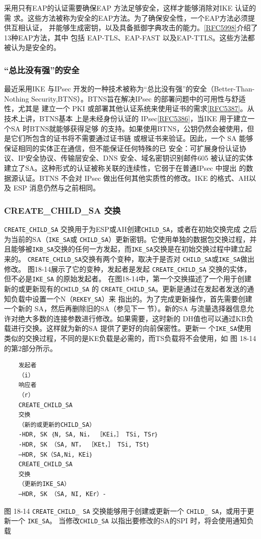 采用只有EAP的认证需要确保EAP 方法足够安全，这样才能够消除对IKE 认证的需
求。这些方法被称为安全的EAP方法。为了确保安全性，一个EAP方法必须提供互相认证，
并能够生成密钥，以及具备抵御字典攻击的能力。\href{https://www.rfc-editor.org/rfc/rfc5998}{[RFC5998]}介绍了13种EAP方法，其中
包括 EAP-TLS、EAP-FAST 以及EAP-TTLS。这些方法都被认为是安全的。

\subsubsection{“总比没有强”的安全}

最近采用IKE 与IPsec 开发的一种技术被称为“总比没有强”的安全（Better-Than-
Nothing Security,BTNS）。BTNS旨在解决IPsec 的部署问题中的可用性与舒适性，尤其是
建立一个 PKI 或部署其他认证系统来使用证书的需求\href{https://www.rfc-editor.org/rfc/rfc5387}{[RFC5387]}。从技术上讲，BTNS基本
上是未经身份认证的 IPsec\href{https://www.rfc-editor.org/rfc/rfc5386}{[RFC5386]}，当IKE 用于建立一个SA 时BTNS就能够获得足够
的支持。如果使用BTNS，公钥仍然会被使用，但是它们所包含的证书将不需要通过证书链
或根证书来验证。因此，一个 SA 能够保证相同的实体正在通信，但不能保证任何特殊的已
安全：可扩展身份认证协议、IP安全协议、传输层安全、DNS 安全、域名密钥识别邮件605
被认证的实体建立了SA。这种形式的认证被称关联的连续性，它弱于在普通IPsec 中提出
的数据源认证。BTNS 不会对 IPsec 做出任何其他实质性的修改。IKE 的格式、AH以及 ESP
消息仍然与之前相同。

\subsubsection{CREATE\_CHILD\_SA 交换}
\verb|CREATE_CHILD_SA| 交换用于为ESP或AH创建\verb|CHILD_SA|，或者在初始交换完成
之后为当前的SA（\verb|IKE_SA|或 \verb|CHILD_SA|）更新密钥。它使用单独的数据包交换过程，并
且能够被\verb|IKB_SA|交换的任何一方发起，而\verb|IKE_SA|交换是在初始交换过程中建立起来的。
\verb|CREATE_CHILD_SA|交换有两个变种，取决于是否对 \verb|CHILD_SA|或\verb|IKE_SA|做出修改。
图18-14展示了它的变种，发起者是发起 \verb|CREATE_CHILD_SA| 交换的实体，但不必是\verb|IKE_SA|
 的原始发起者。
在图18-14中，第一个交换描述了一个用于创建新的或更新现有的\verb|CHILD_SA| 的
\verb|CREATE_CHILD_SA|。更新是通过在发起者发送的通知负载中设置一个N（\verb|REKEY_SA|）来
指出的。为了完成更新操作，首先需要创建一个新的 SA，然后再删除旧的SA（参见下一
节）。新的SA 与流量选择器信息允许对绝大多数的连接参数进行修改。如果需要，这时新的
DH值也可以通过KB负载进行交换。这样就为新的SA 提供了更好的向前保密性。更新一
个\verb|IKE_SA|使用类似的交换过程，不同的是KE负载是必需的，而TS负载将不会使用，如
图 18-14的第2部分所示。
\begin{verbatim}
    发起者
    （i）
    响应者
    （r）
    CREATE_CHILD_SA
    交换
    （新的或更新的CHILD_SA）
    -HDR, SK ｛N, SA, Ni， ［KEi，］ TSi, TSr｝
    -HDR, SK （SA, NT， ［KEt，］ TSi, TSt｝
    —HDR, SK（SA,Ni, KEi｝
    CREATE_CHILD_SA
    交换
    （更新的IKE_SA）
    —HDR, SK （SA, NI, KEr）-
\end{verbatim}
图 18-14 \verb|CREATE_CHILD_ SA| 交换能够用于创建或更新一个 \verb|CHILD_ SA|，或用于更新一个 \verb|IKE_SA|。
当修改\verb|CHILD_SA| 以指出要修改的SA的SPI 时，将会使用通知负载

